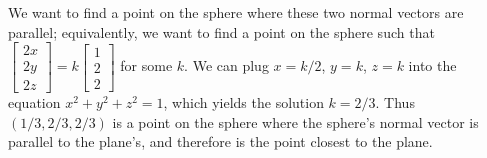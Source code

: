 \documentclass{article}
\begin{document}
\begin{enumerate}
We want to find a point on the sphere where these two normal vectors are
parallel; equivalently, we want to find a point on the sphere such that
$\begin{bmatrix} 2x \\ 2y \\ 2z \end{bmatrix}
 = k\begin{bmatrix} 1 \\ 2 \\ 2 \end{bmatrix}$ for some $k$.  We can plug
$x = k/2$, $y = k$, $z = k$ into the equation $x^2 + y^2 + z^2 = 1$, which
yields the solution $k = 2/3$.  Thus $(1/3, 2/3, 2/3)$ is a point on the
sphere where the sphere's normal vector is parallel to the plane's, and
therefore is the point closest to the plane.

\end{enumerate}
\end{document}
